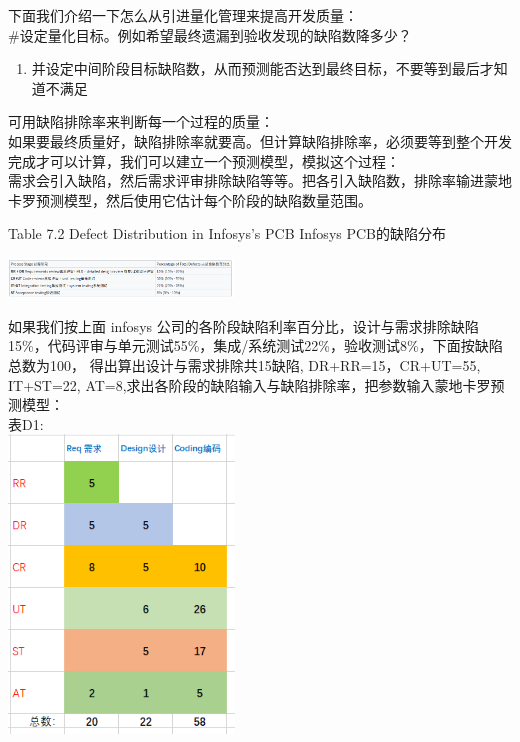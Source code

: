 下面我们介绍一下怎么从引进量化管理来提高开发质量：\\
\#设定量化目标。例如希望最终遗漏到验收发现的缺陷数降多少？

\begin{enumerate}
\tightlist
\item
  并设定中间阶段目标缺陷数，从而预测能否达到最终目标，不要等到最后才知道不满足
\end{enumerate}

可用缺陷排除率来判断每一个过程的质量：\\
如果要最终质量好，缺陷排除率就要高。但计算缺陷排除率，必须要等到整个开发完成才可以计算，我们可以建立一个预测模型，模拟这个过程：\\
需求会引入缺陷，然后需求评审排除缺陷等等。把各引入缺陷数，排除率输进蒙地卡罗预测模型，然后使用它估计每个阶段的缺陷数量范围。

Table 7.2 Defect Distribution in Infosys's PCB Infosys PCB的缺陷分布


\includegraphics[width=6cm]{Screenshotfrom2023-10-1023-46-22.png}

如果我们按上面 infosys
公司的各阶段缺陷利率百分比，设计与需求排除缺陷15\%，代码评审与单元测试55\%，集成/系统测试22\%，验收测试8\%，下面按缺陷总数为100，
得出算出设计与需求排除共15缺陷, DR+RR=15，CR+UT=55, IT+ST=22,
AT=8,求出各阶段的缺陷输入与缺陷排除率，把参数输入蒙地卡罗预测模型：\\
表D1:\\
\includegraphics[width=6cm]{1113correctEgScreenshot_2021-11-13_212414.png}

